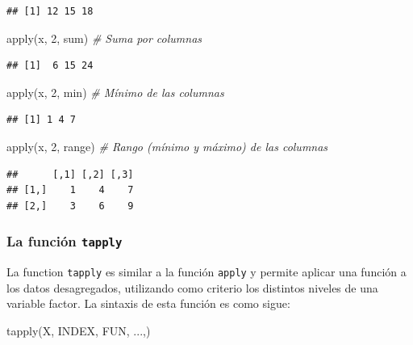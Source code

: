 \documentclass[
]{book}
\newenvironment{Shaded}{\begin{snugshade}}{\end{snugshade}}
\newcommand{\CommentTok}[1]{\textcolor[rgb]{0.56,0.35,0.01}{\textit{#1}}}
\newcommand{\DecValTok}[1]{\textcolor[rgb]{0.00,0.00,0.81}{#1}}
\newcommand{\FunctionTok}[1]{\textcolor[rgb]{0.00,0.00,0.00}{#1}}
\newcommand{\NormalTok}[1]{#1}
\theoremstyle{break}
\begin{document}
\begin{verbatim}
## [1] 12 15 18
\end{verbatim}

\begin{Shaded}
\begin{Highlighting}[]
\FunctionTok{apply}\NormalTok{(x, }\DecValTok{2}\NormalTok{, sum)    }\CommentTok{\# Suma por columnas}
\end{Highlighting}
\end{Shaded}

\begin{verbatim}
## [1]  6 15 24
\end{verbatim}

\begin{Shaded}
\begin{Highlighting}[]
\FunctionTok{apply}\NormalTok{(x, }\DecValTok{2}\NormalTok{, min)    }\CommentTok{\# Mínimo de las columnas}
\end{Highlighting}
\end{Shaded}

\begin{verbatim}
## [1] 1 4 7
\end{verbatim}

\begin{Shaded}
\begin{Highlighting}[]
\FunctionTok{apply}\NormalTok{(x, }\DecValTok{2}\NormalTok{, range)  }\CommentTok{\# Rango (mínimo y máximo) de las columnas}
\end{Highlighting}
\end{Shaded}

\begin{verbatim}
##      [,1] [,2] [,3]
## [1,]    1    4    7
## [2,]    3    6    9
\end{verbatim}

\hypertarget{la-funciuxf3n-tapply}{%
\subsubsection{\texorpdfstring{La función \texttt{tapply}}{La función tapply}}\label{la-funciuxf3n-tapply}}

La function \texttt{tapply} es
similar a la función \texttt{apply} y permite aplicar una función a los datos desagregados,
utilizando como criterio los distintos niveles de una variable factor.
La sintaxis de esta función es como sigue:

\begin{Shaded}
\begin{Highlighting}[]
    \FunctionTok{tapply}\NormalTok{(X, INDEX, FUN, ...,)}
\end{Highlighting}
\end{Shaded}
\end{document}
